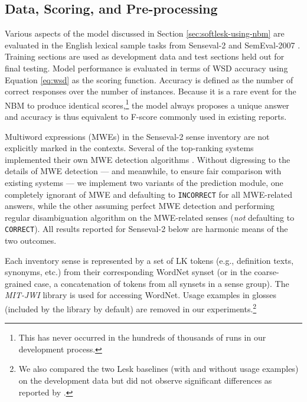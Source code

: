 \documentclass[11pt]{article}
\begin{document}
\subsection{Data, Scoring, and Pre-processing}
\label{sec:benchmarking}
Various aspects of the model discussed in Section
\ref{sec:softlesk-using-nbm} are evaluated in the English lexical
sample tasks from Senseval-2 \citep{edmonds2001senseval} and
SemEval-2007 \citep{pradhan2007semeval}. Training sections are used as
development data and test sections held out for final testing. Model
performance is evaluated in terms of WSD accuracy using Equation
\eqref{eq:wsd} as the scoring function. Accuracy is defined as the
number of correct responses over the number of instances. Because it
is a rare event for the NBM to produce identical scores,\footnote{This
  has never occurred in the hundreds of thousands of runs in our
  development process.} the model always proposes a unique answer and
accuracy is thus equivalent to F-score commonly used in existing
reports.

Multiword expressions (MWEs) in the Senseval-2 sense inventory are not
explicitly marked in the contexts. Several of the top-ranking systems
implemented their own MWE detection algorithms
\citep{kilgarriff2000framework,litkowski:2002:ACL02-WSD}. Without
digressing to the details of MWE detection --- and meanwhile, to
ensure fair comparison with existing systems --- we implement two
variants of the prediction module, one completely ignorant of MWE and
defaulting to \texttt{INCORRECT} for all MWE-related answers,
while the other assuming perfect MWE detection and performing regular
disambiguation algorithm on the MWE-related senses (\textit{not}
defaulting to \texttt{CORRECT}). All results reported for Senseval-2
below are harmonic means of the two outcomes.

Each inventory sense is represented by a set of LK tokens (e.g.,
definition texts, synonyms, etc.\@) from their corresponding WordNet
synset (or in the coarse-grained case, a concatenation of tokens from
all synsets in a sense group).
The \textit{MIT-JWI} library \citep{mit_jwi} is used for accessing
WordNet. Usage examples in glosses (included by the library by
default) are removed in our experiments.\footnote{We also compared the
  two Lesk baselines (with and without usage examples) on the
  development data but did not observe significant differences as
  reported by \citet{kilgarriff2000framework}.}
\end{document}
